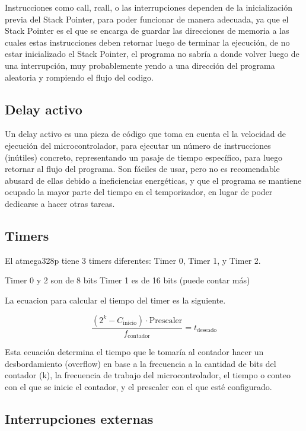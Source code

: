 Instrucciones como call, rcall, o las interrupciones dependen de la inicialización previa del Stack Pointer, para poder funcionar de manera adecuada, ya que el Stack Pointer es el que se encarga de guardar las direcciones de memoria a las cuales estas instrucciones deben retornar luego de terminar la ejecución, de no estar inicializado el Stack Pointer, el programa no sabría a donde volver luego de una interrupción, muy probablemente yendo a una dirección del programa aleatoria y rompiendo el flujo del codigo.

\subsection{Delay activo}
Un delay activo es una pieza de código que toma en cuenta el la velocidad de ejecución del microcontrolador, para ejecutar un número de instrucciones (inútiles) concreto, representando un pasaje de tiempo específico, para luego retornar al flujo del programa. Son fáciles de usar, pero no es recomendable abusard de ellas debido a ineficiencias energéticas, y que el programa se mantiene ocupado la mayor parte del tiempo en el temporizador, en lugar de poder dedicarse a hacer otras tareas.

\subsection{Timers}
El atmega328p tiene 3 timers diferentes: Timer 0, Timer 1, y Timer 2.

Timer 0 y 2 son de 8 bits
Timer 1 es de 16 bits (puede contar más)

La ecuacion para calcular el tiempo del timer es la siguiente.

\begin{equation}
    \frac{(2^{k} - C_{\text{inicio}})\cdot \text{Prescaler}}{f_{\text{contador}}} = t_{\text{deseado}}
\end{equation}

Esta ecuación determina el tiempo que le tomaría al contador hacer un desbordamiento (overflow) en base a la frecuencia a la cantidad de bits del contador (k), la frecuencia de trabajo del microcontrolador, el tiempo o conteo con el que se inicie el contador, y el prescaler con el que esté configurado. 

\subsection{Interrupciones externas}


